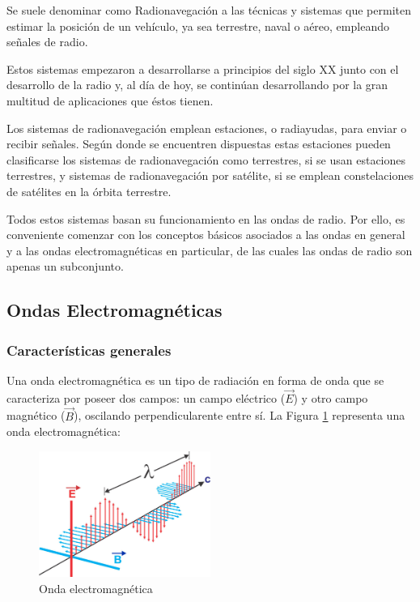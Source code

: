 Se suele denominar como Radionavegaci\'on a las t\'ecnicas y sistemas que permiten estimar la posici\'on de un veh\'iculo, ya sea terrestre, naval o a\'ereo, empleando se\~nales de radio.

Estos sistemas empezaron a desarrollarse a principios del siglo XX junto con el desarrollo de la radio y, al día de hoy, se contin\'uan desarrollando por la gran multitud de aplicaciones que éstos tienen.

Los sistemas de radionavegación emplean estaciones, o radiayudas, para enviar o recibir señales. Seg\'un  donde se encuentren dispuestas estas estaciones pueden clasificarse los sistemas de radionavegación como terrestres, si se usan estaciones terrestres, y sistemas de radionavegación por satélite, si se emplean constelaciones de satélites en la \'orbita terrestre.

Todos estos sistemas basan su funcionamiento en las ondas de radio.
 Por ello, es conveniente comenzar con los conceptos b\'asicos asociados a las ondas en general y a las ondas electromagn\'eticas en particular, de las cuales las ondas de radio son apenas un subconjunto.

\subsection{ Ondas Electromagn\'eticas }
\label{sec:06.ondas.electromagneticas}


\subsubsection{Caracter\'isticas generales}
\label{sec:06.ondas.electromagneticas.caracteristicas.generales}

Una onda electromagn\'etica es un tipo de radiaci\'on en forma de onda que se caracteriza por poseer dos campos: un campo el\'ectrico ($\vec{E}$) y otro campo magn\'etico ($\vec{B}$), oscilando perpendicularente entre s\'i. La Figura \ref{fig:onda-electromagnetica} representa una onda electromagn\'etica: 

\begin{figure}[!h]
  \centering
  \includegraphics[width=0.5\textwidth]{06.radionavegacion/Imagenes/06.00.ondas.electromagneticas/onda_electromagnetica.jpg}  
  \caption{Onda electromagn\'etica \protect\cite{onda_electro_magnetica}}
  \label{fig:onda-electromagnetica}
\end{figure}



